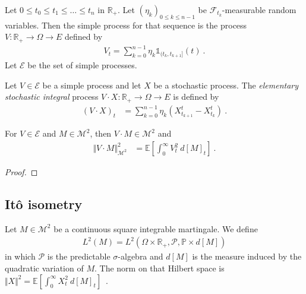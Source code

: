 \begin{definition}\label{def:simpleProcess}
Let $0 \le t_0 \le t_1 \le \ldots \le t_n$ in $\mathbb{R}_+$.
Let $(\eta_k)_{0 \le k \le n-1}$ be $\mathcal{F}_{t_k}$-measurable random variables.
Then the simple process for that sequence is the process $V : \mathbb{R}_+ \to \Omega \to E$ defined by
\begin{align*}
  V_t = \sum_{k=0}^{n-1} \eta_k \mathbb{1}_{(t_k, t_{k+1}]}(t)
  \: .
\end{align*}
Let $\mathcal{E}$ be the set of simple processes.
\end{definition}


\begin{definition}\label{def:elemStochIntegral}
Let $V \in \mathcal{E}$ be a simple process and let $X$ be a stochastic process.
The \emph{elementary stochastic integral} process $V \cdot X : \mathbb{R}_+ \to \Omega \to E$ is defined by
\begin{align*}
  (V \cdot X)_t
  &= \sum_{k=0}^{n-1} \eta_k (X^t_{t_{k+1}} - X^t_{t_k})
  \: .
\end{align*}
\end{definition}


\begin{lemma}\label{lem:sq_norm_elemStochIntegral}
For $V \in \mathcal{E}$ and $M \in \mathcal{M}^2$, then $V \cdot M \in \mathcal{M}^2$ and
\begin{align*}
  \Vert V \cdot M \Vert_{\mathcal{M}^2}^2
  &= \mathbb{E}\left[ \int_0^{\infty} V_t^2 \: d[M]_t \right]
  \: .
\end{align*}
\end{lemma}

\begin{proof}

\end{proof}


\subsection{Itô isometry}

\begin{definition}\label{def:L2M}
Let $M \in \mathcal{M}^2$ be a continuous square integrable martingale. We define
\begin{align*}
  L^2(M) = L^2(\Omega \times \mathbb{R}_+, \mathcal{P}, \mathbb{P} \times d[M])
\end{align*}
in which $\mathcal{P}$ is the predictable $\sigma$-algebra and $d[M]$ is the measure induced by the quadratic variation of $M$.
The norm on that Hilbert space is $\Vert X \Vert^2 = \mathbb{E}\left[ \int_0^{\infty} X_t^2 \: d[M]_t \right]$~.
\end{definition}

